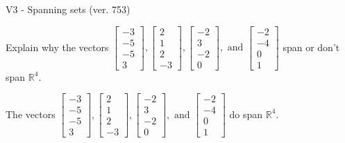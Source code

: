 \begin{exercise}
  \begin{exerciseTitle}V3 - Spanning sets (ver. 753)\end{exerciseTitle}
  \begin{exerciseStatement}
    Explain why the vectors \(\left[\begin{array}{r}
-3 \\
-5 \\
-5 \\
3
\end{array}\right] , \left[\begin{array}{r}
2 \\
1 \\
2 \\
-3
\end{array}\right] , \left[\begin{array}{r}
-2 \\
3 \\
-2 \\
0
\end{array}\right] , \text{ and } \left[\begin{array}{r}
-2 \\
-4 \\
0 \\
1
\end{array}\right]\) span or don't span \(\mathbb{R}^4\). 
	


  \end{exerciseStatement}
  \begin{exerciseAnswer}
   The vectors \(\left[\begin{array}{r}
-3 \\
-5 \\
-5 \\
3
\end{array}\right] , \left[\begin{array}{r}
2 \\
1 \\
2 \\
-3
\end{array}\right] , \left[\begin{array}{r}
-2 \\
3 \\
-2 \\
0
\end{array}\right] , \text{ and } \left[\begin{array}{r}
-2 \\
-4 \\
0 \\
1
\end{array}\right]\) 
  	 do  
	span \(\mathbb{R}^4\).
  


  \end{exerciseAnswer}
\end{exercise}